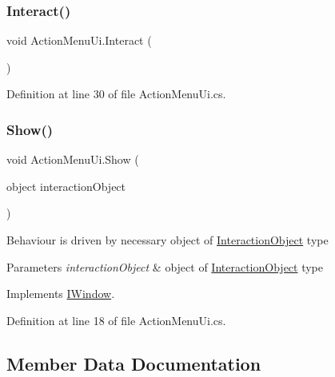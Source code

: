 \subsubsection{\texorpdfstring{Interact()}{Interact()}}
{\footnotesize\ttfamily void Action\+Menu\+Ui.\+Interact (\begin{DoxyParamCaption}{ }\end{DoxyParamCaption})}



Definition at line 30 of file Action\+Menu\+Ui.\+cs.

\mbox{\label{class_action_menu_ui_a8eb85d66f1eb4b4531400dfca9a3b19a}} 
\subsubsection{\texorpdfstring{Show()}{Show()}}
{\footnotesize\ttfamily void Action\+Menu\+Ui.\+Show (\begin{DoxyParamCaption}\item[{object}]{interaction\+Object }\end{DoxyParamCaption})}



Behaviour is driven by necessary object of \mbox{\hyperlink{class_interaction_object}{Interaction\+Object}} type 


\begin{DoxyParams}{Parameters}
{\em interaction\+Object} & object of \mbox{\hyperlink{class_interaction_object}{Interaction\+Object}} type\\
\hline
\end{DoxyParams}


Implements \mbox{\hyperlink{interface_i_window_aba12a3c53948d87aef07aed93b225aa9}{I\+Window}}.



Definition at line 18 of file Action\+Menu\+Ui.\+cs.



\subsection{Member Data Documentation}
\mbox{\label{class_action_menu_ui_a125b419d9b19f37c0e57bf574b3b5431}} 
